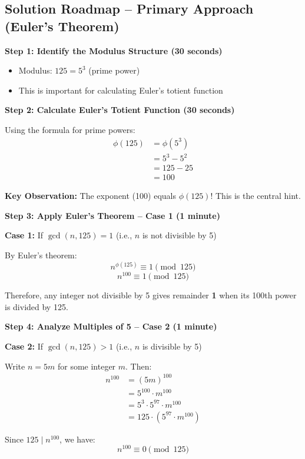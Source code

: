 \documentclass[12pt]{article}
\begin{document}
\vspace{1em}

\begin{solutionbox}
\subsection*{Solution Roadmap -- Primary Approach (Euler's Theorem)}

\textbf{Step 1: Identify the Modulus Structure (30 seconds)}
\begin{itemize}
    \item Modulus: $125 = 5^3$ (prime power)
    \item This is important for calculating Euler's totient function
\end{itemize}

\textbf{Step 2: Calculate Euler's Totient Function (30 seconds)}

Using the formula for prime powers:
\begin{align*}
\phi(125) &= \phi(5^3) \\
&= 5^3 - 5^2 \\
&= 125 - 25 \\
&= 100
\end{align*}

\textbf{Key Observation:} The exponent (100) equals $\phi(125)$! This is the central hint.

\textbf{Step 3: Apply Euler's Theorem -- Case 1 (1 minute)}

\textbf{Case 1:} If $\gcd(n, 125) = 1$ (i.e., $n$ is not divisible by 5)

By Euler's theorem:
\[n^{\phi(125)} \equiv 1 \pmod{125}\]
\[n^{100} \equiv 1 \pmod{125}\]

Therefore, any integer not divisible by 5 gives remainder \textbf{1} when its 100th power is divided by 125.

\textbf{Step 4: Analyze Multiples of 5 -- Case 2 (1 minute)}

\textbf{Case 2:} If $\gcd(n, 125) > 1$ (i.e., $n$ is divisible by 5)

Write $n = 5m$ for some integer $m$. Then:
\begin{align*}
n^{100} &= (5m)^{100} \\
&= 5^{100} \cdot m^{100} \\
&= 5^3 \cdot 5^{97} \cdot m^{100} \\
&= 125 \cdot (5^{97} \cdot m^{100})
\end{align*}

Since $125 \mid n^{100}$, we have:
\[n^{100} \equiv 0 \pmod{125}\]


\end{solutionbox}
\end{document}
